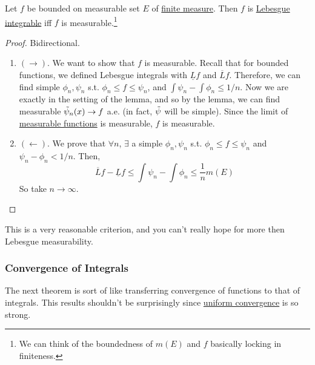   \begin{theorem}
    \label{thm:condition-of-lebesgue-integrability}
    Let $f$ be bounded on measurable set $E$ of \hyperref[def:finite-measure]{finite measure}. Then $f$ is \hyperref[def:leb-int-signed]{Lebesgue integrable} iff $f$ is measurable.\footnote{We can think of the boundedness of $m(E)$ and $f$ basically locking in finiteness.}
  \end{theorem}
  \begin{proof}
    Bidirectional. 
    \begin{enumerate}
      \item $(\rightarrow)$. We want to show that $f$ is measurable. Recall that for bounded functions, we defined Lebesgue integrals with $\underline{L}f$ and $\overline{L}f$. Therefore, we can find simple $\phi_n, \psi_n$ s.t. $\phi_n \leq f \leq \psi_n$, and $\int \psi_n - \int \phi_n \leq 1/n$. Now we are exactly in the setting of the lemma, and so by the lemma, we can find measurable $\Tilde{\psi}_n (x) \to f$ a.e. (in fact, $\Tilde{\psi}$ will be simple). Since the limit of \hyperref[def:measurable-function]{measurable functions} is measurable, $f$ is measurable.
      \item $(\leftarrow)$. We prove that $\forall n$, $\exists$ a simple $\phi_n, \psi_n$ s.t. $\phi_n \leq f \leq \psi_n$  and $\psi_n - \phi_n < 1/n$. Then, 
        \begin{equation}
          \overline{L} f - \underline{L} f \leq \int \psi_n - \int \phi_n \leq \frac{1}{n} m(E)
        \end{equation}
        So take $n \to \infty$. 
    \end{enumerate}
  \end{proof}

  This is a very reasonable criterion, and you can't really hope for more then Lebesgue measurability. 

\subsubsection{Convergence of Integrals}

  The next theorem is sort of like transferring convergence of functions to that of integrals. This results shouldn't be surprisingly since \hyperref[real-def:uniform-convergence]{uniform convergence} is so strong.  

